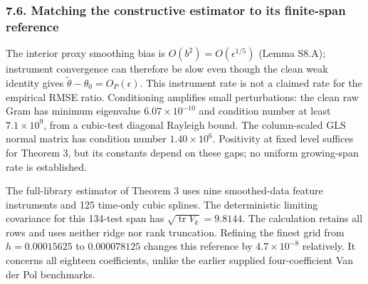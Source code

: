 \documentclass[
  american,
  11pt,
]{article}
\begin{document}
\subsubsection{7.6. Matching the constructive estimator to its
finite-span
reference}\label{matching-the-constructive-estimator-to-its-finite-span-reference}

The interior proxy smoothing bias is \(O(b^2)=O(\epsilon^{1/5})\) (Lemma
S8.A); instrument convergence can therefore be slow even though the
clean weak identity gives \(\widetilde\theta-\theta_0=O_P(\epsilon)\).
This instrument rate is not a claimed rate for the empirical RMSE ratio.
Conditioning amplifies small perturbations: the clean raw Gram has
minimum eigenvalue \(6.07\times10^{-10}\) and condition number at least
\(7.1\times10^9\), from a cubic-test diagonal Rayleigh bound. The
column-scaled GLS normal matrix has condition number \(1.40\times10^6\).
Positivity at fixed level suffices for Theorem 3, but its constants
depend on these gaps; no uniform growing-span rate is established.

The full-library estimator of Theorem 3 uses nine smoothed-data feature
instruments and 125 time-only cubic splines. The deterministic limiting
covariance for this 134-test span has
\(\sqrt{\operatorname{tr}V_k}=9.8144\). The calculation retains all rows
and uses neither ridge nor rank truncation. Refining the finest grid
from \(h=0.00015625\) to \(0.000078125\) changes this reference by
\(4.7\times10^{-8}\) relatively. It concerns all eighteen coefficients,
unlike the earlier supplied four-coefficient Van der Pol benchmarks.
\end{document}

